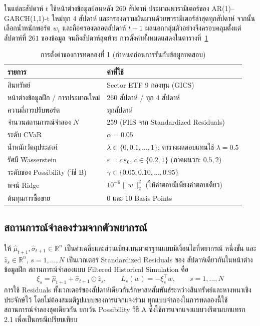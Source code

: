 ในแต่ละสัปดาห์ $t$ ใช้หน้าต่างข้อมูลย้อนหลัง $260$ สัปดาห์ ประมาณพารามิเตอร์ของ AR(1)--GARCH(1,1)-t
ใหม่ทุก $4$ สัปดาห์ และกรองความผันผวนด้วยพารามิเตอร์ล่าสุดทุกสัปดาห์ จากนั้นเลือกน้ำหนักพอร์ต
$w_t$ และถือครองตลอดสัปดาห์ $t+1$ ผลนอกกลุ่มตัวอย่างจึงครอบคลุมตั้งแต่สัปดาห์ที่ $261$ ของข้อมูล
จนถึงสัปดาห์สุดท้าย การตั้งค่าทั้งหมดแสดงในตารางที่~\ref{tab:exp1-config}

\begin{table}[htbp]
\centering
\caption{การตั้งค่าของการทดลองที่ 1 (กำหนดก่อนการรันกับข้อมูลทดสอบ)}
\label{tab:exp1-config}
\begin{tabular}{ll}
\toprule
รายการ & ค่าที่ใช้ \\
\midrule
สินทรัพย์ & Sector ETF 9 กองทุน (GICS) \\
หน้าต่างข้อมูลฝึก / การประมาณใหม่ & 260 สัปดาห์ / ทุก 4 สัปดาห์ \\
ความถี่การปรับพอร์ต & ทุกสัปดาห์ \\
จำนวนสถานการณ์จำลอง $N$ & 259 (FHS จาก Standardized Residuals) \\
ระดับ CVaR & $\alpha = 0.05$ \\
น้ำหนักวัตถุประสงค์ & $\lambda \in \{0, 0.1, \ldots, 1\}$; ตารางผลตอบแทนใช้ $\lambda = 0.5$ \\
รัศมี Wasserstein & $\varepsilon = c\,\varepsilon_0$, $c \in \{0.2, 1\}$ (ภาคผนวก: $0.5, 2$) \\
ระดับของ Possibility (วิธี B) & $\gamma \in \{0.05, 0.10, \ldots, 0.95\}$ \\
พจน์ Ridge & $10^{-6}\lVert w \rVert_2^2$ (ให้คำตอบมีเพียงคำตอบเดียว) \\
ต้นทุนการซื้อขาย & 0 และ 10 Basis Points \\
\bottomrule
\end{tabular}
\end{table}

\subsection{สถานการณ์จำลองร่วมจากตัวพยากรณ์}

ให้ $\hat\mu_{t+1}, \hat\sigma_{t+1} \in \mathbb{R}^n$ เป็นค่าเฉลี่ยและส่วนเบี่ยงเบนมาตรฐานแบบมีเงื่อนไขที่พยากรณ์
หนึ่งขั้น และ $\hat z_s \in \mathbb{R}^n$, $s = 1,\ldots,N$ เป็นเวกเตอร์ Standardized Residuals ของ
สัปดาห์เดียวกันในหน้าต่างข้อมูลฝึก สถานการณ์จำลองแบบ Filtered Historical Simulation คือ
\begin{equation}
\xi_s = \hat\mu_{t+1} + \hat\sigma_{t+1} \odot \hat z_s, \qquad
L_s(w) = -\xi_s^\top w, \qquad s = 1, \ldots, N
\label{eq:exp1-fhs}
\end{equation}
การใช้ Residuals ทั้งเวกเตอร์ของสัปดาห์เดียวกันรักษาสหสัมพันธ์ระหว่างสินทรัพย์และหางหนาเชิง
ประจักษ์ไว้ โดยไม่ต้องสมมติรูปแบบของการแจกแจงร่วม ทุกแบบจำลองในการทดลองนี้ใช้
สถานการณ์จำลองชุดเดียวกัน ยกเว้น Possibility วิธี A ซึ่งใช้การแจกแจงแบบวงรีตามบทแทรก 2.1
เพื่อเป็นกรณีเปรียบเทียบ

